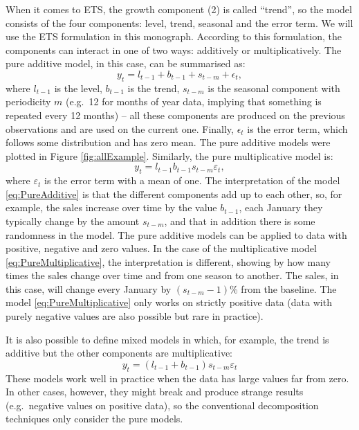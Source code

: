 \documentclass[]{book}
\theoremstyle{definition}
\theoremstyle{definition}
\theoremstyle{definition}
\theoremstyle{definition}
\theoremstyle{remark}
\begin{document}
When it comes to ETS, the growth component (2) is called ``trend'', so the model consists of the four components: level, trend, seasonal and the error term. We will use the ETS formulation in this monograph. According to this formulation, the components can interact in one of two ways: additively or multiplicatively. The pure additive model, in this case, can be summarised as:
\begin{equation}
    y_t = l_{t-1} + b_{t-1} + s_{t-m} + \epsilon_t ,
    \label{eq:PureAdditive}
\end{equation}
where \(l_{t-1}\) is the level, \(b_{t-1}\) is the trend, \(s_{t-m}\) is the seasonal component with periodicity \(m\) (e.g.~12 for months of year data, implying that something is repeated every 12 months) -- all these components are produced on the previous observations and are used on the current one. Finally, \(\epsilon_t\) is the error term, which follows some distribution and has zero mean. The pure additive models were plotted in Figure \ref{fig:allExample}. Similarly, the pure multiplicative model is:
\begin{equation}
    y_t = l_{t-1} b_{t-1} s_{t-m} \varepsilon_t ,
    \label{eq:PureMultiplicative}
\end{equation}
where \(\varepsilon_t\) is the error term with a mean of one. The interpretation of the model \eqref{eq:PureAdditive} is that the different components add up to each other, so, for example, the sales increase over time by the value \(b_{t-1}\), each January they typically change by the amount \(s_{t-m}\), and that in addition there is some randomness in the model. The pure additive models can be applied to data with positive, negative and zero values. In the case of the multiplicative model \eqref{eq:PureMultiplicative}, the interpretation is different, showing by how many times the sales change over time and from one season to another. The sales, in this case, will change every January by \((s_{t-m}-1)\)\% from the baseline. The model \eqref{eq:PureMultiplicative} only works on strictly positive data (data with purely negative values are also possible but rare in practice).

It is also possible to define mixed models in which, for example, the trend is additive but the other components are multiplicative:
\begin{equation}
    y_t = (l_{t-1} + b_{t-1}) s_{t-m} \varepsilon_t
    \label{eq:MixedAdditiveTrend}
\end{equation}
These models work well in practice when the data has large values far from zero. In other cases, however, they might break and produce strange results (e.g.~negative values on positive data), so the conventional decomposition techniques only consider the pure models.
\end{document}
